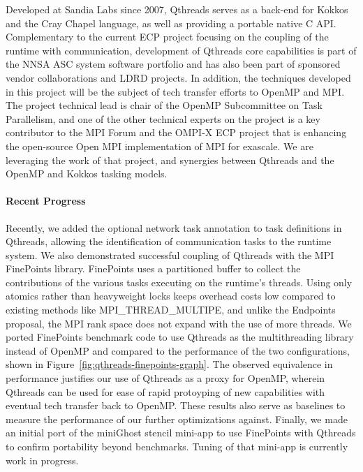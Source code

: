 Developed at Sandia Labs since 2007, Qthreads serves as a back-end for Kokkos and the Cray Chapel language, as well as providing a portable native C API. Complementary to the current ECP project focusing on the coupling of the runtime with communication, development of Qthreads core capabilities is part of the NNSA ASC system software portfolio and has also been part of sponsored vendor collaborations and LDRD projects.  In addition, the techniques developed in this project will be the subject of tech transfer efforts to OpenMP and MPI.  The project technical lead is chair of the OpenMP Subcommittee on Task Parallelism, and one of the other technical experts on the project is a key contributor to the MPI Forum and the OMPI-X ECP project that is enhancing the open-source Open MPI implementation of MPI for exascale.  We are leveraging the work of that project, and synergies between Qthreads and the OpenMP and Kokkos tasking models.


\paragraph{Recent Progress}

Recently, we added the optional network task annotation to task definitions in Qthreads, allowing the identification of communication tasks to the runtime system.  We also demonstrated successful coupling of Qthreads with the MPI FinePoints library.  FinePoints uses a partitioned buffer to collect the contributions of the various tasks executing on the runtime’s threads.  Using only atomics rather than heavyweight locks keeps overhead costs low compared to existing methods like MPI\_THREAD\_MULTIPE, and unlike the Endpoints proposal, the MPI rank space does not expand with the use of more threads.  We ported FinePoints benchmark code to use Qthreads as the multithreading library instead of OpenMP and compared to the performance of the two configurations, shown in Figure~\ref{fig:qthreads-finepoints-graph}. The observed equivalence in performance justifies our use of Qthreads as a proxy for OpenMP, wherein Qthreads can be used for ease of rapid protoyping of new capabilities with eventual tech transfer back to OpenMP.  These results also serve as baselines to measure the performance of our further optimizations against.  Finally, we made an initial port of the miniGhost stencil mini-app to use FinePoints with Qthreads to confirm portability beyond benchmarks.  Tuning of that mini-app is currently work in progress.

